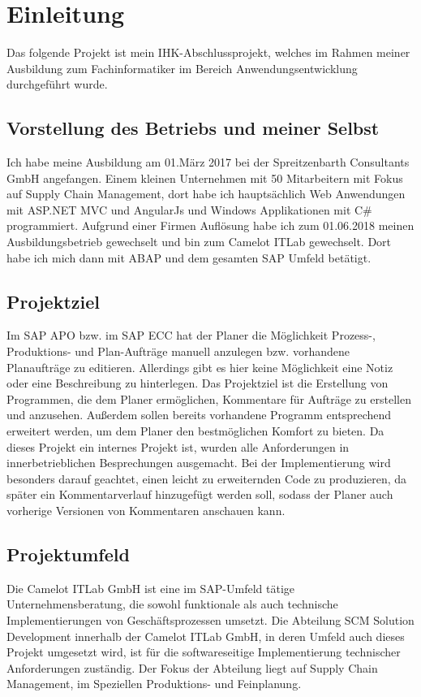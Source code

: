 \section{Einleitung}
\label{sec:Einleitung}
Das folgende Projekt ist mein IHK-Abschlussprojekt, welches im Rahmen meiner Ausbildung zum Fachinformatiker im Bereich Anwendungsentwicklung durchgeführt wurde.

\subsection{Vorstellung des Betriebs und meiner Selbst} 
\label{sec:Vorstellung des Betriebs und meiner Selbst}
Ich habe meine Ausbildung am 01.März 2017 bei der Spreitzenbarth Consultants GmbH angefangen. Einem kleinen Unternehmen mit 50 Mitarbeitern mit Fokus auf Supply Chain Management, dort habe ich hauptsächlich Web Anwendungen mit ASP.NET MVC und AngularJs  und Windows Applikationen mit C\# programmiert. Aufgrund einer Firmen Auflösung habe ich zum 01.06.2018 meinen Ausbildungsbetrieb gewechselt und bin zum Camelot ITLab gewechselt. Dort habe ich mich dann mit \ac{ABAP} und dem gesamten SAP Umfeld betätigt.

\subsection{Projektziel} 
\label{sec:Projektziel}
Im SAP \ac{APO} bzw. im SAP \ac{ECC} hat der Planer die Möglichkeit Prozess-, Produktions- und Plan-Aufträge manuell anzulegen bzw. vorhandene Planaufträge zu editieren. Allerdings gibt es hier keine Möglichkeit eine Notiz oder eine Beschreibung zu hinterlegen. Das Projektziel ist die Erstellung von Programmen, die dem Planer ermöglichen, Kommentare	für Aufträge zu erstellen und anzusehen. Außerdem sollen bereits vorhandene Programm entsprechend erweitert werden, um dem Planer den bestmöglichen Komfort zu bieten. Da dieses Projekt ein internes Projekt ist, wurden alle Anforderungen in innerbetrieblichen Besprechungen ausgemacht.  Bei der Implementierung wird besonders darauf geachtet, einen leicht zu erweiternden Code zu produzieren, da später ein Kommentarverlauf hinzugefügt werden soll, sodass der Planer auch vorherige Versionen von Kommentaren anschauen kann. 

\subsection{Projektumfeld}
\label{sec:Projektumfeld}
Die Camelot ITLab GmbH ist eine im SAP-Umfeld tätige Unternehmensberatung, die sowohl funktionale als auch technische Implementierungen von Geschäftsprozessen umsetzt.	Die Abteilung SCM Solution Development innerhalb der Camelot ITLab GmbH, in deren Umfeld	auch dieses Projekt umgesetzt wird, ist für die softwareseitige Implementierung technischer	Anforderungen zuständig. Der Fokus der Abteilung liegt auf Supply Chain Management, im Speziellen Produktions- und Feinplanung.

